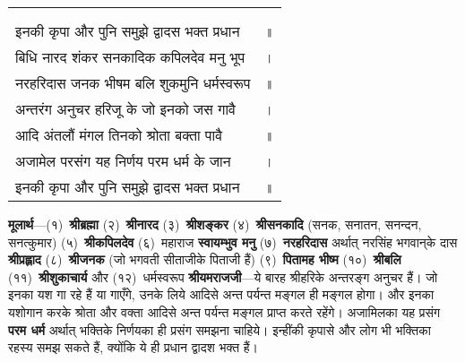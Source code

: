 {
{\bfseries
\setlength{\mylenone}{0pt}
\settowidth{\mylentwo}{}
\setlength{\mylenone}{\maxof{\mylenone}{\mylentwo}}
\settowidth{\mylentwo}{इनकी कृपा और पुनि समुझे द्वादस भक्त प्रधान}
\setlength{\mylenone}{\maxof{\mylenone}{\mylentwo}}
\settowidth{\mylentwo}{बिधि नारद शंकर सनकादिक कपिलदेव मनु भूप}
\setlength{\mylenone}{\maxof{\mylenone}{\mylentwo}}
\settowidth{\mylentwo}{नरहरिदास जनक भीषम बलि शुकमुनि धर्मस्वरूप}
\setlength{\mylenone}{\maxof{\mylenone}{\mylentwo}}
\settowidth{\mylentwo}{अन्तरंग अनुचर हरिजू के जो इनको जस गावै}
\setlength{\mylenone}{\maxof{\mylenone}{\mylentwo}}
\settowidth{\mylentwo}{आदि अंतलौं मंगल तिनको श्रोता बक्ता पावै}
\setlength{\mylenone}{\maxof{\mylenone}{\mylentwo}}
\settowidth{\mylentwo}{अजामेल परसंग यह निर्णय परम धर्म के जान}
\setlength{\mylenone}{\maxof{\mylenone}{\mylentwo}}
\settowidth{\mylentwo}{इनकी कृपा और पुनि समुझे द्वादस भक्त प्रधान}
\setlength{\mylenone}{\maxof{\mylenone}{\mylentwo}}
\setlength{\mylentwo}{\baselineskip}
\setlength{\mylenone}{\mylenone + 1pt}
\begin{longtable}[l]{@{\hspace*{\mylen}}>{\setlength\parfillskip{0pt}}p{\mylenone}@{}@{}l@{}}
 & \\[-\the\mylentwo]
\centering{॥ ७ \hspace*{-1.5mm}॥} & \\ \nopagebreak
इनकी कृपा और पुनि समुझे द्वादस भक्त प्रधान & ॥\\
बिधि नारद शंकर सनकादिक कपिलदेव मनु भूप & ।\\ \nopagebreak
नरहरिदास जनक भीषम बलि शुकमुनि धर्मस्वरूप & ॥\\
अन्तरंग अनुचर हरिजू के जो इनको जस गावै & ।\\ \nopagebreak
आदि अंतलौं मंगल तिनको श्रोता बक्ता पावै & ॥\\
अजामेल परसंग यह निर्णय परम धर्म के जान & ।\\ \nopagebreak
इनकी कृपा और पुनि समुझे द्वादस भक्त प्रधान & ॥
\end{longtable}
}
}
\begin{sloppypar}\justifying{}
\textbf{मूलार्थ}—(१)~\textbf{श्रीब्रह्मा} (२)~\textbf{श्रीनारद} (३)~\textbf{श्रीशङ्कर} (४)~\textbf{श्रीसनकादि} (सनक, सनातन, सनन्दन, सनत्कुमार) (५)~\textbf{श्रीकपिलदेव} (६)~महाराज \textbf{स्वायम्भुव मनु} (७)~\textbf{नरहरिदास} अर्थात् नरसिंह भगवान्‌के दास \textbf{श्रीप्रह्लाद} (८)~\textbf{श्रीजनक} (जो भगवती सीताजीके पिताजी हैं) (९)~\textbf{पितामह भीष्म} (१०)~\textbf{श्रीबलि} (११)~\textbf{श्रीशुकाचार्य} और (१२)~धर्मस्वरूप \textbf{श्रीयमराजजी}—ये बारह श्रीहरिके अन्तरङ्ग अनुचर हैं। जो इनका यश गा रहे हैं या गाएँगे, उनके लिये आदिसे अन्त पर्यन्त मङ्गल ही मङ्गल होगा। और इनका यशोगान करके श्रोता और वक्ता आदिसे अन्त पर्यन्त मङ्गल प्राप्त करते रहेंगे। अजामिलका यह प्रसंग \textbf{परम धर्म} अर्थात् भक्तिके निर्णयका ही प्रसंग समझना चाहिये। इन्हींकी कृपासे और लोग भी भक्तिका रहस्य समझ सकते हैं, क्योंकि ये ही प्रधान द्वादश भक्त हैं।
\end{sloppypar}
